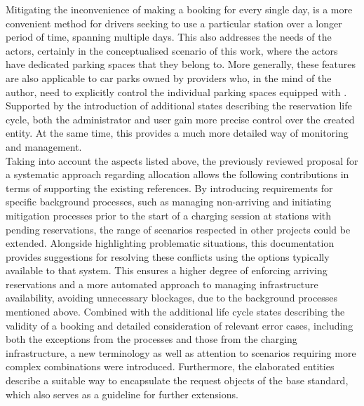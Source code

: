 Mitigating the inconvenience of making a booking for every single day, is a more convenient method for drivers seeking to use a particular station over a longer period of time, spanning multiple days. This also addresses the needs of the actors, certainly in the conceptualised scenario of this work, where the actors have dedicated parking spaces that they belong to.
More generally, these features are also applicable to car parks owned by providers who, in the mind of the author, need to explicitly control the individual parking spaces equipped with .
Supported by the introduction of additional states describing the reservation life cycle, both the administrator and user gain more precise control over the created entity. At the same time, this provides a much more detailed way of monitoring and management.  \\
\noindent Taking into account the aspects listed above, the previously reviewed proposal for a systematic approach regarding  allocation allows the following contributions in terms of supporting the existing references.
By introducing requirements for specific background processes, such as managing non-arriving  and initiating mitigation processes prior to the start of a charging session at stations with pending reservations, the range of scenarios respected in other projects could be extended.
Alongside highlighting problematic situations, this documentation provides suggestions for resolving these conflicts using the options typically available to that system.
This ensures a higher degree of enforcing arriving reservations and a more automated approach to managing infrastructure availability, avoiding unnecessary blockages, due to the background processes mentioned above. 
Combined with the additional life cycle states describing the validity of a booking and detailed consideration of relevant error cases, including both the exceptions from the processes and those from the charging infrastructure, a new terminology as well as attention to scenarios requiring more complex combinations were introduced.
Furthermore, the elaborated entities describe a suitable way to encapsulate the request objects of the base standard, which also serves as a guideline for further extensions. \\
